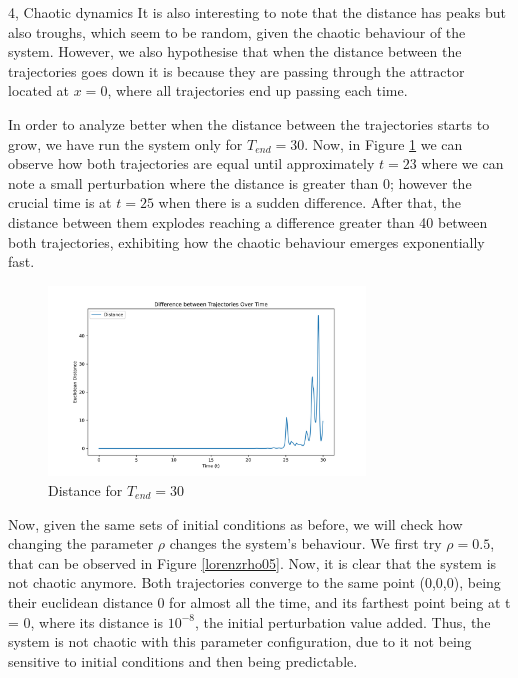 \begin{task}{4, Chaotic dynamics}
It is also interesting to note that the distance has peaks but also troughs, which seem to be random, given the chaotic behaviour of the system. However, we also hypothesise that when the distance between the trajectories goes down it is because they are passing through the attractor located at \(x = 0\), where all trajectories end up passing each time.

In order to analyze better when the distance between the trajectories starts to grow, we have run the system only for \(T_{end} = 30\). Now, in Figure \ref{dist30} we can observe how both trajectories are equal until approximately \(t = 23\) where we can note a small perturbation where the distance is greater than 0; however the crucial time is at \(t = 25\) when there is a sudden difference. After that, the distance between them explodes reaching a difference greater than 40 between both trajectories, exhibiting how the chaotic behaviour emerges exponentially fast.

\begin{figure}[H]
    \centering
    \includegraphics[width=0.75\textwidth]{images/distance_trajectories_30.png}
    \caption{Distance for \(T_{end} = 30\)}
    \label{dist30}
\end{figure}

Now, given the same sets of initial conditions as before, we will check how changing the parameter \(\rho\) changes the system's behaviour. We first try \(\rho = 0.5\), that can be observed in Figure \ref{lorenzrho05}. Now, it is clear that the system is not chaotic anymore. Both trajectories converge to the same point (0,0,0), being their euclidean distance 0 for almost all the time, and its farthest point being at t = 0, where its distance is \(10^{-8}\), the initial perturbation value added. Thus, the system is not chaotic with this parameter configuration, due to it not being sensitive to initial conditions and then being predictable.


\end{task}
